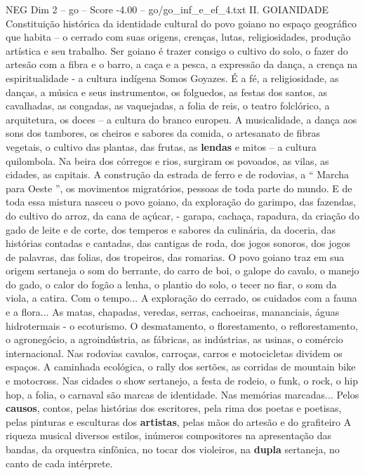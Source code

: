 \begin{textsample}{NEG Dim 2 – go – Score -4.00 – go/go\_inf\_e\_ef\_4.txt}  \label{ex:f2_neg_112}
II.
GOIANIDADE Constituição histórica da identidade cultural do povo goiano no espaço geográfico que habita – o cerrado com suas origens, crenças, lutas, religiosidades, produção artística e seu trabalho.
Ser goiano é trazer consigo o cultivo do solo, o fazer do artesão com a fibra e o barro, a caça e a pesca, a expressão da dança, a crença na espiritualidade - a cultura indígena Somos Goyazes.
É a fé, a religiosidade, as danças, a música e seus instrumentos, os folguedos, as festas dos santos, as cavalhadas, as congadas, as vaquejadas, a folia de reis, o teatro folclórico, a arquitetura, os doces – a cultura do branco europeu.
A musicalidade, a dança aos sons dos tambores, os cheiros e sabores da comida, o artesanato de fibras vegetais, o cultivo das plantas, das frutas, as \textbf{lendas} e mitos – a cultura quilombola.
Na beira dos córregos e rios, surgiram os povoados, as vilas, as cidades, as capitais.
A construção da estrada de ferro e de rodovias, a “ Marcha para Oeste ”, os movimentos migratórios, pessoas de toda parte do mundo.
E de toda essa mistura nasceu o povo goiano, da exploração do garimpo, das fazendas, do cultivo do arroz, da cana de açúcar, - garapa, cachaça, rapadura, da criação do gado de leite e de corte, dos temperos e sabores da culinária, da doceria, das histórias contadas e cantadas, das cantigas de roda, dos jogos sonoros, dos jogos de palavras, das folias, dos tropeiros, das romarias.
O povo goiano traz em sua origem sertaneja o som do berrante, do carro de boi, o galope do cavalo, o manejo do gado, o calor do fogão a lenha, o plantio do solo, o tecer no fiar, o som da viola, a catira.
Com o tempo...
A exploração do cerrado, os cuidados com a fauna e a flora...
As matas, chapadas, veredas, serras, cachoeiras, mananciais, águas hidrotermais - o ecoturismo.
O desmatamento, o florestamento, o reflorestamento, o agronegócio, a agroindústria, as fábricas, as indústrias, as usinas, o comércio internacional.
Nas rodovias cavalos, carroças, carros e motocicletas dividem os espaços.
A caminhada ecológica, o rally dos sertões, as corridas de mountain bike e motocross.
Nas cidades o show sertanejo, a festa de rodeio, o funk, o rock, o hip hop, a folia, o carnaval são marcas de identidade.
Nas memórias marcadas...
Pelos \textbf{causos}, contos, pelas histórias dos escritores, pela rima dos poetas e poetisas, pelas pinturas e esculturas dos \textbf{artistas}, pelas mãos do artesão e do grafiteiro A riqueza musical diversos estilos, inúmeros compositores na apresentação das bandas, da orquestra sinfônica, no tocar dos violeiros, na \textbf{dupla} sertaneja, no canto de cada intérprete.

\end{textsample}
